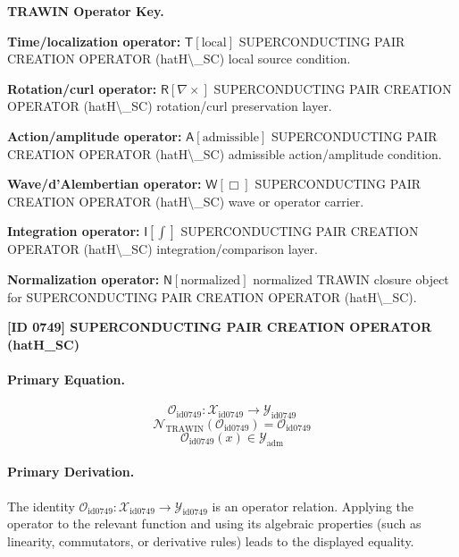 \par\vspace{0.45\baselineskip}
\noindent\begin{minipage}[t]{\linewidth}
\begingroup
\small
\raggedright
\textbf{TRAWIN Operator Key.}\par
\noindent\textbf{Time/localization operator:} $\mathsf{T}\!\left[\mathrm{local}\right]$ SUPERCONDUCTING PAIR CREATION OPERATOR (hatH\textbackslash{}\_SC) local source condition.\par
\noindent\textbf{Rotation/curl operator:} $\mathsf{R}\!\left[\nabla\times\right]$ SUPERCONDUCTING PAIR CREATION OPERATOR (hatH\textbackslash{}\_SC) rotation/curl preservation layer.\par
\noindent\textbf{Action/amplitude operator:} $\mathsf{A}\!\left[\mathrm{admissible}\right]$ SUPERCONDUCTING PAIR CREATION OPERATOR (hatH\textbackslash{}\_SC) admissible action/amplitude condition.\par
\noindent\textbf{Wave/d'Alembertian operator:} $\mathsf{W}\!\left[\Box\right]$ SUPERCONDUCTING PAIR CREATION OPERATOR (hatH\textbackslash{}\_SC) wave or operator carrier.\par
\noindent\textbf{Integration operator:} $\mathsf{I}\!\left[\int\right]$ SUPERCONDUCTING PAIR CREATION OPERATOR (hatH\textbackslash{}\_SC) integration/comparison layer.\par
\noindent\textbf{Normalization operator:} $\mathsf{N}\!\left[\mathrm{normalized}\right]$ normalized TRAWIN closure object for SUPERCONDUCTING PAIR CREATION OPERATOR (hatH\textbackslash{}\_SC).\par
\endgroup
\end{minipage}

\clearpage
\noindent\textbf{[ID 0749] SUPERCONDUCTING PAIR CREATION OPERATOR (hatH\_SC)}\par
\vspace{0.35em}
\paragraph{Primary Equation.}
\[
\mathcal{O}_{\mathrm{id0749}}:\mathcal{X}_{\mathrm{id0749}}\longrightarrow\mathcal{Y}_{\mathrm{id0749}}
\]
\[
\mathcal{N}_{\mathrm{TRAWIN}}(\mathcal{O}_{\mathrm{id0749}})=\mathcal{O}_{\mathrm{id0749}}
\]
\[
\mathcal{O}_{\mathrm{id0749}}(x)\in\mathcal{Y}_{\mathrm{adm}}
\]

\paragraph{Primary Derivation.}
The identity \( \mathcal{O}_{\mathrm{id0749}}:\mathcal{X}_{\mathrm{id0749}}\longrightarrow\mathcal{Y}_{\mathrm{id0749}} \) is an operator relation. Applying the operator to the relevant function and using its algebraic properties (such as linearity, commutators, or derivative rules) leads to the displayed equality.
